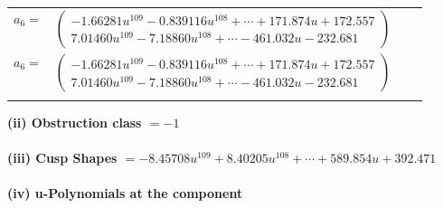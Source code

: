 \documentclass[1p]{elsarticle_modified}
\theoremstyle{definition}
\begin{document}
\begin{tabular}{m{7pt} m{180pt} m{7pt} m{180pt} }
\flushright $a_{6}=$&$\begin{pmatrix}-1.66281 u^{109}-0.839116 u^{108}+\cdots+171.874 u+172.557\\7.01460 u^{109}-7.18860 u^{108}+\cdots-461.032 u-232.681\end{pmatrix}$\\ \flushright $a_{6}=$&$\begin{pmatrix}-1.66281 u^{109}-0.839116 u^{108}+\cdots+171.874 u+172.557\\7.01460 u^{109}-7.18860 u^{108}+\cdots-461.032 u-232.681\end{pmatrix}$\\&\end{tabular}
\flushleft \textbf{(ii) Obstruction class $= -1$}\\~\\
\flushleft \textbf{(iii) Cusp Shapes $= -8.45708 u^{109}+8.40205 u^{108}+\cdots+589.854 u+392.471$}\\~\\
\newpage\renewcommand{\arraystretch}{1}
\flushleft \textbf{(iv) u-Polynomials at the component}\newline \\
\end{document}
